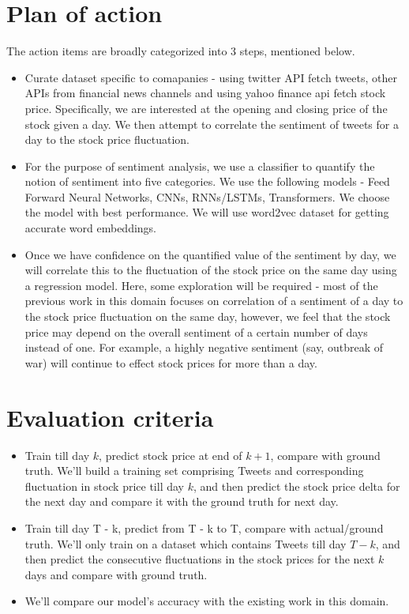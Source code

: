 \documentclass{article}
\begin{document}
\section{Plan of action}
The action items are broadly categorized into 3 steps, mentioned below.
\begin{itemize}
    \item Curate dataset specific to comapanies - using twitter API fetch tweets, other APIs from financial news channels and using yahoo finance api fetch stock price. Specifically, we are interested at the opening and closing price of the stock given a day. We then attempt to correlate the sentiment of tweets for a day to the stock price fluctuation.
    \item For the purpose of sentiment analysis, we use a classifier to quantify the notion of sentiment into five categories. We use the following models - Feed Forward Neural Networks, CNNs, RNNs/LSTMs, Transformers. We choose the model with best performance. We will use word2vec dataset for getting accurate word embeddings.
    \item Once we have confidence on the quantified value of the sentiment by day, we will correlate this to the fluctuation of the stock price on the same day using a regression model. Here, some exploration will be required - most of the previous work in this domain focuses on correlation of a sentiment of a day to the stock price fluctuation on the same day, however, we feel that the stock price may depend on the overall sentiment of a certain number of days instead of one. For example, a highly negative sentiment (say, outbreak of war) will continue to effect stock prices for more than a day.
\end{itemize}

\section{Evaluation criteria}
\begin{itemize}
    \item Train till day $k$, predict stock price at end of $k+1$, compare with ground truth. We'll build a training set comprising Tweets and corresponding fluctuation in stock price till day $k$, and then predict the stock price delta for the next day and compare it with the ground truth for next day.
    \item Train till day T - k, predict from T - k to T, compare with actual/ground truth. We'll only train on a dataset which contains Tweets till day $T - k$, and then predict the consecutive fluctuations in the stock prices for the next $k$ days and compare with ground truth.
    \item We'll compare our model's accuracy with the existing work in this domain.
\end{itemize}
\end{document}
